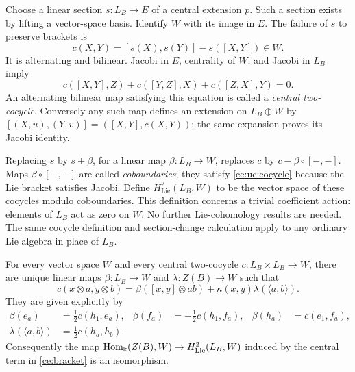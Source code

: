 Choose a linear section $s:L_B\to E$ of a central extension $p$.
Such a section exists by lifting a vector-space basis.  Identify $W$
with its image in $E$.  The failure of $s$ to preserve brackets is
\[
 c(X,Y)=[s(X),s(Y)]-s([X,Y])\in W.
\]
It is alternating and bilinear.  Jacobi in $E$, centrality of $W$, and
Jacobi in $L_B$ imply
\begin{equation}\label{ce:uc:cocycle}
 c([X,Y],Z)+c([Y,Z],X)+c([Z,X],Y)=0.
\end{equation}
An alternating bilinear map satisfying this equation is called a
\emph{central two-cocycle}.  Conversely any such map defines an extension
on $L_B\oplus W$ by $[(X,u),(Y,v)]=([X,Y],c(X,Y))$; the same expansion
proves its Jacobi identity.

Replacing $s$ by $s+\beta$, for a linear map $\beta:L_B\to W$, replaces
$c$ by $c-\beta\circ[-,-]$.  Maps $\beta\circ[-,-]$ are called
\emph{coboundaries}; they satisfy \eqref{ce:uc:cocycle} because the Lie
bracket satisfies Jacobi.  Define $H^2_{\mathrm{Lie}}(L_B,W)$ to be the vector space
of these cocycles modulo coboundaries.  This definition concerns a
trivial coefficient action: elements of $L_B$ act as zero on $W$.
No further Lie-cohomology results are needed.  The same cocycle
definition and section-change calculation apply to any ordinary Lie
algebra in place of $L_B$.

\begin{theorem}
\label{ce:uc:classification}
For every vector space $W$ and every central two-cocycle
$c:L_B\times L_B\to W$, there are unique linear maps
$\beta:L_B\to W$ and $\lambda:Z(B)\to W$ such that
\begin{equation}\label{ce:uc:classification-formula}
 c(x\otimes a,y\otimes b)
 =\beta([x,y]\otimes ab)+\kappa(x,y)\lambda(\langle a,b\rangle).
\end{equation}
They are given explicitly by
\begin{align}
 \beta(e_a)&=\tfrac12c(h_1,e_a),&
 \beta(f_a)&=-\tfrac12c(h_1,f_a),&
 \beta(h_a)&=c(e_1,f_a),\label{ce:uc:beta}\\
 \lambda(\langle a,b\rangle)&=\tfrac12c(h_a,h_b).
 &&&\label{ce:uc:lambda}
\end{align}
Consequently the map
$\operatorname{Hom}_\Bbbk(Z(B),W)\to H^2_{\mathrm{Lie}}(L_B,W)$ induced by the central
term in \eqref{ce:bracket} is an isomorphism.
\end{theorem}

